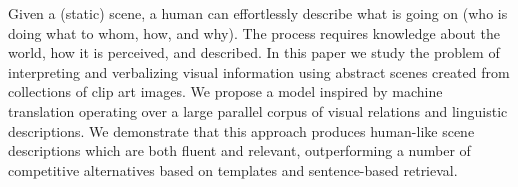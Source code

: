 Given a (static) scene, a human can effortlessly describe what is going on (who is doing what to whom, how, and why). The process requires knowledge about the world, how it is perceived, and described. In this paper we study the problem of interpreting and verbalizing visual information using abstract scenes created from collections of clip art images. We propose a model inspired by machine translation operating over a large parallel corpus of visual relations and linguistic descriptions. We demonstrate that this approach produces human-like scene descriptions which are both fluent and relevant, outperforming a number of competitive alternatives based on templates and sentence-based retrieval.
